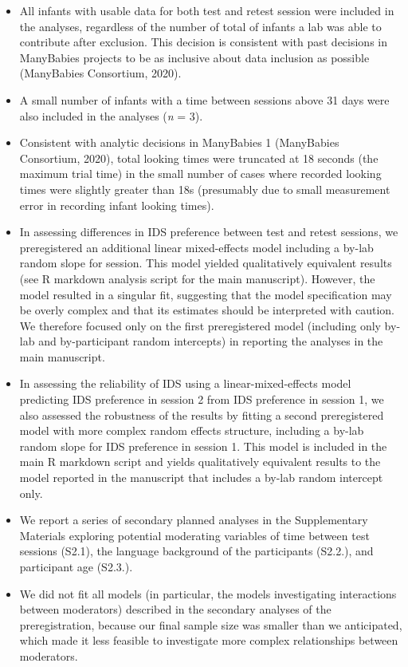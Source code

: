 \documentclass[
  man, donotrepeattitle,floatsintext]{apa6}
\providecommand{\tightlist}{%
  \setlength{\itemsep}{0pt}\setlength{\parskip}{0pt}}
\begin{document}
\begin{itemize}
\tightlist
\item
  All infants with usable data for both test and retest session were included in the analyses, regardless of the number of total of infants a lab was able to contribute after exclusion. This decision is consistent with past decisions in ManyBabies projects to be as inclusive about data inclusion as possible (ManyBabies Consortium, 2020).
\item
  A small number of infants with a time between sessions above 31 days were also included in the analyses (\emph{n} = 3).
\item
  Consistent with analytic decisions in ManyBabies 1 (ManyBabies Consortium, 2020), total looking times were truncated at 18 seconds (the maximum trial time) in the small number of cases where recorded looking times were slightly greater than 18s (presumably due to small measurement error in recording infant looking times).
\item
  In assessing differences in IDS preference between test and retest sessions, we preregistered an additional linear mixed-effects model including a by-lab random slope for session. This model yielded qualitatively equivalent results (see R markdown analysis script for the main manuscript). However, the model resulted in a singular fit, suggesting that the model specification may be overly complex and that its estimates should be interpreted with caution. We therefore focused only on the first preregistered model (including only by-lab and by-participant random intercepts) in reporting the analyses in the main manuscript.
\item
  In assessing the reliability of IDS using a linear-mixed-effects model predicting IDS preference in session 2 from IDS preference in session 1, we also assessed the robustness of the results by fitting a second preregistered model with more complex random effects structure, including a by-lab random slope for IDS preference in session 1. This model is included in the main R markdown script and yields qualitatively equivalent results to the model reported in the manuscript that includes a by-lab random intercept only.
\item
  We report a series of secondary planned analyses in the Supplementary Materials exploring potential moderating variables of time between test sessions (S2.1), the language background of the participants (S2.2.), and participant age (S2.3.).
\item
  We did not fit all models (in particular, the models investigating interactions between moderators) described in the secondary analyses of the preregistration, because our final sample size was smaller than we anticipated, which made it less feasible to investigate more complex relationships between moderators.
\end{itemize}
\end{document}
